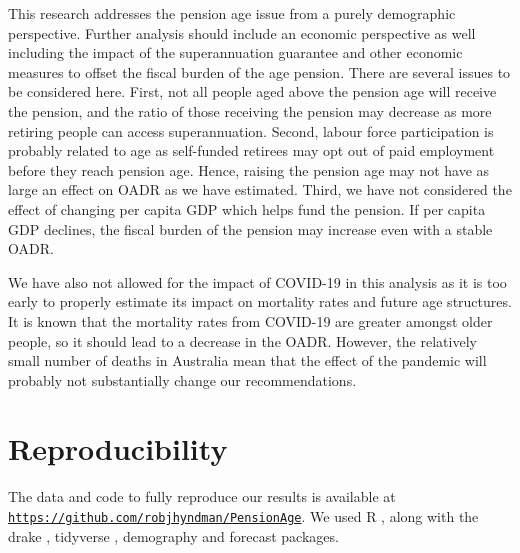 \documentclass[
  doublespace]{anzsauth}
\begin{document}
This research addresses the pension age issue from a purely demographic perspective. Further analysis should include an economic perspective as well including the impact of the superannuation guarantee and other economic measures to offset the fiscal burden of the age pension. There are several issues to be considered here. First, not all people aged above the pension age will receive the pension, and the ratio of those receiving the pension may decrease as more retiring people can access superannuation. Second, labour force participation is probably related to age as self-funded retirees may opt out of paid employment before they reach pension age. Hence, raising the pension age may not have as large an effect on OADR as we have estimated. Third, we have not considered the effect of changing per capita GDP which helps fund the pension. If per capita GDP declines, the fiscal burden of the pension may increase even with a stable OADR.

We have also not allowed for the impact of COVID-19 in this analysis as it is too early to properly estimate its impact on mortality rates and future age structures. It is known that the mortality rates from COVID-19 are greater amongst older people, so it should lead to a decrease in the OADR. However, the relatively small number of deaths in Australia mean that the effect of the pandemic will probably not substantially change our recommendations.

\hypertarget{reproducibility}{%
\section*{Reproducibility}\label{reproducibility}}

The data and code to fully reproduce our results is available at \href{https://github.com/robjhyndman/PensionAge}{\texttt{https://github.com/robjhyndman/PensionAge}}. We used R \citep{RCore}, along with the drake \citep{Rdrake}, tidyverse \citep{Rtidyverse}, demography \citep{Rdemography} and forecast \citep{Rforecast} packages.

  
\end{document}
